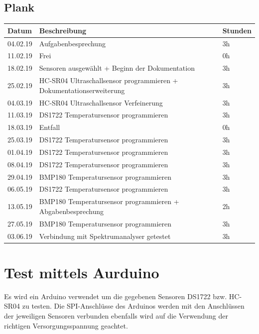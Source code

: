\documentclass[12pt,a4paper,german]{article}
\begin{document}
\subsection{Plank}
\begin{table}[H]
\centering 
\begin{tabularx}{\textwidth}{|l|X|l|}
\hline
\textbf{Datum} & \textbf{Beschreibung} & \textbf{Stunden} \\ 
\hline
\hline
04.02.19 & Aufgabenbesprechung & 3h \\ 
\hline
11.02.19 & Frei & 0h \\ 
\hline
18.02.19 & Sensoren ausgewählt + Beginn der Dokumentation & 3h \\ 
\hline
25.02.19 & HC-SR04 Ultraschallsensor programmieren + Dokumentationserweiterung & 3h \\ 
\hline
04.03.19 & HC-SR04 Ultraschallsensor Verfeinerung& 3h \\ 
\hline
11.03.19 & DS1722 Temperatursensor programmieren & 3h \\ 
\hline
18.03.19 & Entfall & 0h\\ 
\hline
25.03.19 & DS1722 Temperatursensor programmieren & 3h \\ 
\hline
01.04.19 & DS1722 Temperatursensor programmieren & 3h \\ 
\hline
08.04.19 & DS1722 Temperatursensor programmieren & 3h \\ 
\hline
29.04.19 & BMP180 Temperatursensor programmieren & 3h \\ 
\hline
06.05.19 & DS1722 Temperatursensor programmieren & 3h \\
\hline
13.05.19 & BMP180 Temperatursensor programmieren + Abgabenbesprechung & 2h \\ 
\hline
27.05.19 & BMP180 Temperatursensor programmieren &3h \\ 
\hline
03.06.19 & Verbindung mit Spektrumanalyser getestet & 3h \\ 
\hline
\end{tabularx}
\end{table}


\section{Test mittels Aurduino}

Es wird ein Arduino verwendet um die gegebenen Sensoren DS1722 bzw. HC-SR04 zu 
testen. Die SPI-Anschlüsse des Arduinos werden mit den Anschlüssen der
jeweiligen Sensoren verbunden ebenfalls wird auf die Verwendung der richtigen Versorgungsspannung geachtet.
\end{document}
